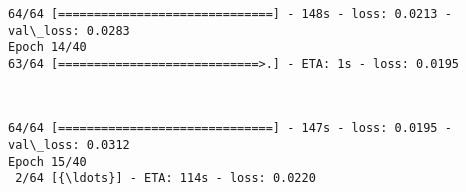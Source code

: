 \documentclass[11pt]{article}
\begin{document}
    \begin{Verbatim}[commandchars=\\\{\}]
64/64 [==============================] - 148s - loss: 0.0213 - val\_loss: 0.0283
Epoch 14/40
63/64 [============================>.] - ETA: 1s - loss: 0.0195
    \end{Verbatim}

    \begin{center}
    \end{center}
    { \hspace*{\fill} \\}
    
    \begin{Verbatim}[commandchars=\\\{\}]
64/64 [==============================] - 147s - loss: 0.0195 - val\_loss: 0.0312
Epoch 15/40
 2/64 [{\ldots}] - ETA: 114s - loss: 0.0220
    \end{Verbatim}
\end{document}
